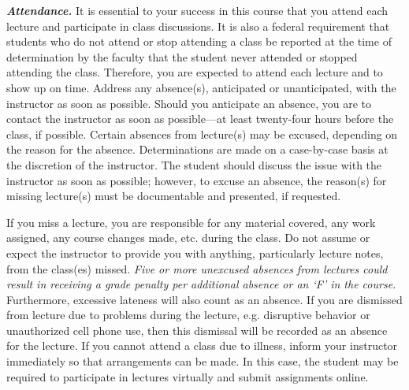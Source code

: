\documentclass[11pt,letterpaper]{article}
\begin{document}

{\itshape\bfseries\color{scred}Attendance.} It is essential to your success in this course that you attend each lecture and participate in class discussions. It is also a federal requirement that students who do not attend or stop attending a class be reported at the time of determination by the faculty that the student never attended or stopped attending the class. Therefore, you are expected to attend each lecture and to show up on time. Address any absence(s), anticipated or unanticipated, with the instructor as soon as possible. Should you anticipate an absence, you are to contact the instructor as soon as possible---at least twenty-four hours before the class, if possible. Certain absences from lecture(s) may be excused, depending on the reason for the absence. Determinations are made on a case-by-case basis at the discretion of the instructor. The student should discuss the issue with the instructor as soon as possible; however, to excuse an absence, the reason(s) for missing lecture(s) must be documentable and presented, if requested. \pspace

If you miss a lecture, you are responsible for any material covered, any work assigned, any course changes made, etc. during the class. Do not assume or expect the instructor to provide you with anything, particularly lecture notes, from the class(es) missed. {\itshape Five or more unexcused absences from lectures could result in receiving a grade penalty per additional absence or an `F' in the course.} Furthermore, excessive lateness will also count as an absence. If you are dismissed from lecture due to problems during the lecture, e.g. disruptive behavior or unauthorized cell phone use, then this dismissal will be recorded as an absence for the lecture. If you cannot attend a class due to illness, inform your instructor immediately so that arrangements can be made. In this case, the student may be required to participate in lectures virtually and submit assignments online. \pspace
\end{document}
